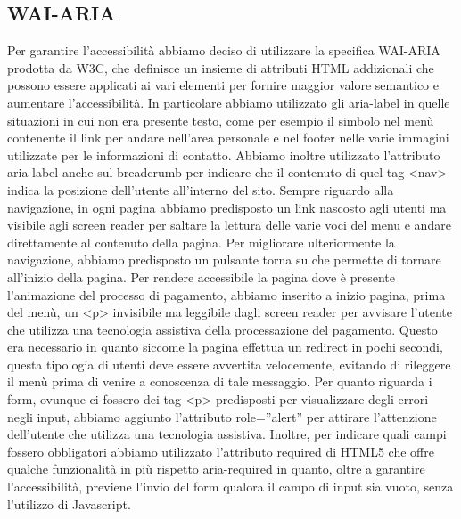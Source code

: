 \documentclass[a4paper]{article}
\begin{document}
	\subsection{WAI-ARIA}
	Per garantire l'accessibilità abbiamo deciso di utilizzare la specifica WAI-ARIA prodotta da W3C, che definisce un insieme di attributi HTML addizionali che possono essere applicati ai vari elementi per fornire maggior valore semantico e aumentare l'accessibilità. In particolare abbiamo utilizzato gli aria-label in quelle situazioni in cui non era presente testo, come per esempio il simbolo nel menù contenente il link per andare nell'area personale e nel footer nelle varie immagini utilizzate per le informazioni di contatto. Abbiamo inoltre utilizzato l'attributo aria-label anche sul breadcrumb per indicare che il contenuto di quel tag <nav> indica la posizione dell'utente all'interno del sito. Sempre riguardo alla navigazione, in ogni pagina abbiamo predisposto un link nascosto agli utenti ma visibile agli screen reader per saltare la lettura delle varie voci del menu e andare direttamente al contenuto della pagina. Per migliorare ulteriormente la navigazione, abbiamo predisposto un pulsante torna su che permette di tornare all'inizio della pagina. Per rendere accessibile la pagina dove è presente l'animazione del processo di pagamento, abbiamo inserito a inizio pagina, prima del menù, un <p> invisibile ma leggibile dagli screen reader per avvisare l'utente che utilizza una tecnologia assistiva della processazione del pagamento. Questo era necessario in quanto siccome la pagina effettua un redirect in pochi secondi, questa tipologia di utenti deve essere avvertita velocemente, evitando di rileggere il menù prima di venire a conoscenza di tale messaggio. Per quanto riguarda i form, ovunque ci fossero dei tag <p> predisposti per visualizzare degli errori negli input, abbiamo aggiunto l'attributo role=”alert” per attirare l'attenzione dell'utente che utilizza una tecnologia assistiva. Inoltre, per indicare quali campi fossero obbligatori abbiamo utilizzato l'attributo required di HTML5 che offre qualche funzionalità in più rispetto aria-required in quanto, oltre a garantire l'accessibilità, previene l'invio del form qualora il campo di input sia vuoto, senza l'utilizzo di Javascript.
\end{document}
